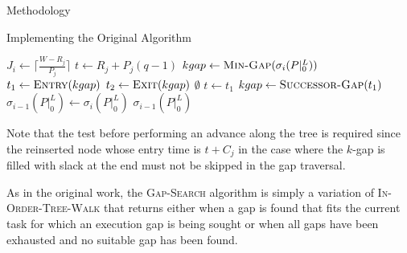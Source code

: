 \documentclass{article}
\begin{document}
\begin{section}{Methodology}
\begin{subsection}{Implementing the Original Algorithm}
\begin{paragraph}{}
    \begin{algorithm}[H]
      \caption{Gap-Tranformation Algorithm\autocite[12]{BelwalCheng}}\label{gapxfrm1}
      \begin{algorithmic}[2]
          \State $J_{i} \gets \lceil\frac{W - R_{j}}{P_{j}}\rceil$
            \State $t \gets R_{j} + P_{j}(q-1)$
            \State $kgap \gets \Call{Min-Gap}{\sigma_{i}(P|_{0}^{L})}$
            \State $t_{1} \gets \Call{Entry}{kgap}$
            \State $t_{2} \gets \Call{Exit}{kgap}$
                \State \Return $\emptyset$
              \EndIf
                \State $t \gets t_{1}$
              \EndIf
                \State \Call{Gap-Delete}{$\sigma_{i}(P|_{0}^{L}), [t_{1},t_{2})$}
                  \State \Call{Gap-Insert}{$\sigma_{i}(P|_{0}^{L}), [t_{1},t)$}
                  \ExitWhile
                \EndIf
                  \State \Call{Gap-Insert}{$\sigma_{i}(P|_{0}^{L}), [t_{1},t)$}
                  \State \Call{Gap-Insert}{$\sigma_{i}(P|_{0}^{L}), [t + C_{j},t_{2})$}
                  \ExitWhile
                \EndIf
                  \State \Call{Gap-Insert}{$\sigma_{i}(P|_{0}^{L}), [t_{1},t)$}
                \EndIf
              \EndIf
                \State $kgap \gets \Call{Successor-Gap}{t_{1}}$
              \EndIf
            \EndWhile
          \EndFor
          \State $\sigma_{i-1}(P|_{0}^{L}) \gets \sigma_{i}(P|_{0}^{L})$
          \State \Return $\sigma_{i-1}(P|_{0}^{L})$
        \EndFunction
      \end{algorithmic}
    \end{algorithm}
    \end{paragraph}
    \begin{paragraph}{}
      Note that the test before performing an advance along the tree is required
      since the reinserted node whose entry time is $t + C_{j}$ in the case where
      the $k$-gap is filled with slack at the end must not be skipped in the gap traversal.
    \end{paragraph}
    \begin{paragraph}{}
      As in the original work, the \textsc{Gap-Search}\autocite[12-13]{BelwalCheng} algorithm is simply a variation of \textsc{In-Order-Tree-Walk}\autocite[245-246]{CLR}
      that returns either when a gap is found that fits the current task for which an execution gap is being sought
      or when all gaps have been exhausted and no suitable gap has been found.
    \end{paragraph}
  \end{subsection}


\end{section}
\end{document}
